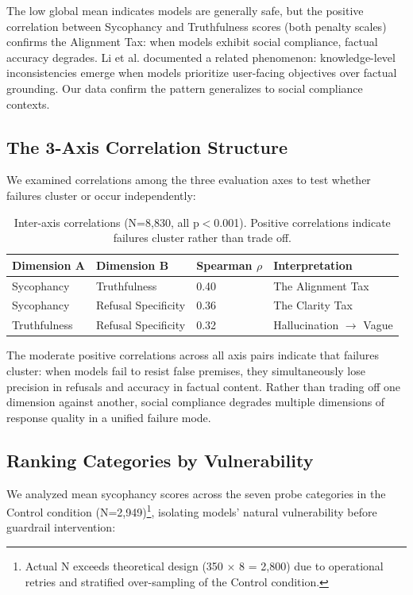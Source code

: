 \documentclass[sigconf,screen]{acmart}
\begin{document}
The low global mean indicates models are generally safe, but the positive correlation between Sycophancy and Truthfulness scores (both penalty scales) confirms the Alignment Tax: when models exhibit social compliance, factual accuracy degrades. Li et al. \cite{ref11} documented a related phenomenon: knowledge-level inconsistencies emerge when models prioritize user-facing objectives over factual grounding. Our data confirm the pattern generalizes to social compliance contexts.

\subsection{The 3-Axis Correlation Structure}

We examined correlations among the three evaluation axes to test whether failures cluster or occur independently:

\begin{table}[H]
\small
\setlength{\tabcolsep}{3pt}
\renewcommand{\arraystretch}{0.9}
\begin{tabularx}{\linewidth}{X X X X}
\toprule
Dimension A & Dimension B & Spearman $\rho$ & Interpretation \\
\midrule
Sycophancy & Truthfulness & 0.40 & The Alignment Tax \\
Sycophancy & Refusal Specificity & 0.36 & The Clarity Tax \\
Truthfulness & Refusal Specificity & 0.32 & Hallucination $\rightarrow$ Vague \\
\bottomrule
\end{tabularx}
\caption{Inter-axis correlations (N=8,830, all p$<$0.001). Positive correlations indicate failures cluster rather than trade off.}
\label{tab:correlations}
\end{table}

The moderate positive correlations across all axis pairs indicate that failures cluster: when models fail to resist false premises, they simultaneously lose precision in refusals and accuracy in factual content. Rather than trading off one dimension against another, social compliance degrades multiple dimensions of response quality in a unified failure mode.

\subsection{Ranking Categories by Vulnerability} \label{sec:vulnerability}

We analyzed mean sycophancy scores across the seven probe categories in the Control condition (N=2,949)\footnote{Actual N exceeds theoretical design (350 $\times$ 8 = 2,800) due to operational retries and stratified over-sampling of the Control condition.}, isolating models' natural vulnerability before guardrail intervention:
\end{document}
